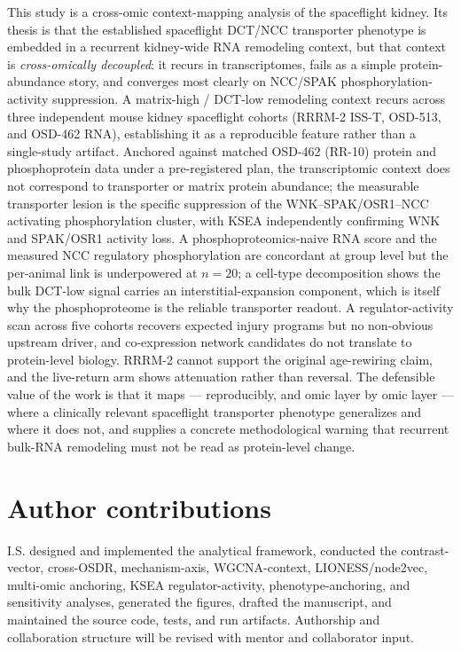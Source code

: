 \documentclass[11pt]{article}
\begin{document}
This study is a cross-omic context-mapping analysis of the spaceflight kidney. Its thesis is that the established spaceflight DCT/NCC transporter phenotype is embedded in a recurrent kidney-wide RNA remodeling context, but that context is \emph{cross-omically decoupled}: it recurs in transcriptomes, fails as a simple protein-abundance story, and converges most clearly on NCC/SPAK phosphorylation-activity suppression. A matrix-high / DCT-low remodeling context recurs across three independent mouse kidney spaceflight cohorts (RRRM-2 ISS-T, OSD-513, and OSD-462 RNA), establishing it as a reproducible feature rather than a single-study artifact. Anchored against matched OSD-462 (RR-10) protein and phosphoprotein data under a pre-registered plan, the transcriptomic context does not correspond to transporter or matrix protein abundance; the measurable transporter lesion is the specific suppression of the WNK--SPAK/OSR1--NCC activating phosphorylation cluster, with KSEA independently confirming WNK and SPAK/OSR1 activity loss. A phosphoproteomics-naive RNA score and the measured NCC regulatory phosphorylation are concordant at group level but the per-animal link is underpowered at $n=20$; a cell-type decomposition shows the bulk DCT-low signal carries an interstitial-expansion component, which is itself why the phosphoproteome is the reliable transporter readout. A regulator-activity scan across five cohorts recovers expected injury programs but no non-obvious upstream driver, and co-expression network candidates do not translate to protein-level biology. RRRM-2 cannot support the original age-rewiring claim, and the live-return arm shows attenuation rather than reversal. The defensible value of the work is that it maps --- reproducibly, and omic layer by omic layer --- where a clinically relevant spaceflight transporter phenotype generalizes and where it does not, and supplies a concrete methodological warning that recurrent bulk-RNA remodeling must not be read as protein-level change.

\section*{Author contributions}
I.S. designed and implemented the analytical framework, conducted the contrast-vector, cross-OSDR, mechanism-axis, WGCNA-context, LIONESS/node2vec, multi-omic anchoring, KSEA regulator-activity, phenotype-anchoring, and sensitivity analyses, generated the figures, drafted the manuscript, and maintained the source code, tests, and run artifacts. Authorship and collaboration structure will be revised with mentor and collaborator input.
\end{document}
